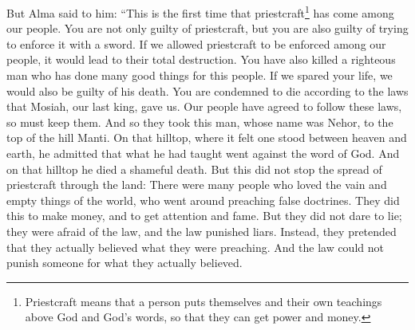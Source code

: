 But Alma said to him: ``This is the first time that priestcraft\footnote{Priestcraft means that a person puts themselves and their own teachings above God and God's words, so that they can get power and money.} has come among our people. You are not only guilty of priestcraft, but you are also guilty of trying to enforce it with a sword. If we allowed priestcraft to be enforced among our people, it would lead to their total destruction.
\bverse \iffalse And thou hast shed the blood of a righteous man, yea, a man who has done much good among this people; and were we to spare thee his blood would come upon us for vengeance. \fi
You have also killed a righteous man who has done many good things for this people. If we spared your life, we would also be guilty of his death.
\bverse \iffalse Therefore thou art condemned to die, according to the law which has been given us by Mosiah, our last king; and it has been acknowledged by this people; therefore this people must abide by the law. \fi
You are condemned to die according to the laws that Mosiah, our last king, gave us. Our people have agreed to follow these laws, so must keep them.
\bverse \iffalse And it came to pass that they took him; and his name was Nehor; and they carried him upon the top of the hill Manti, and there he was caused, or rather did acknowledge, between the heavens and the earth, that what he had taught to the people was contrary to the word of God; and there he suffered an ignominious death. \fi
And so they took this man, whose name was Nehor, to the top of the hill Manti. On that hilltop, where it felt one stood between heaven and earth, he admitted that what he had taught went against the word of God. And on that hilltop he died a shameful death.
\bverse \iffalse Nevertheless, this did not put an end to the spreading of priestcraft through the land; for there were many who loved the vain things of the world, and they went forth preaching false doctrines; and this they did for the sake of riches and honor. \fi
But this did not stop the spread of priestcraft through the land: There were many people who loved the vain and empty things of the world, who went around preaching false doctrines. They did this to make money, and to get attention and fame.
\bverse \iffalse Nevertheless, they durst not lie, if it were known, for fear of the law, for liars were punished; therefore they pretended to preach according to their belief; and now the law could have no power on any man for his belief. \fi
But they did not dare to lie; they were afraid of the law, and the law punished liars. Instead, they pretended that they actually believed what they were preaching. And the law could not punish someone for what they actually believed.
